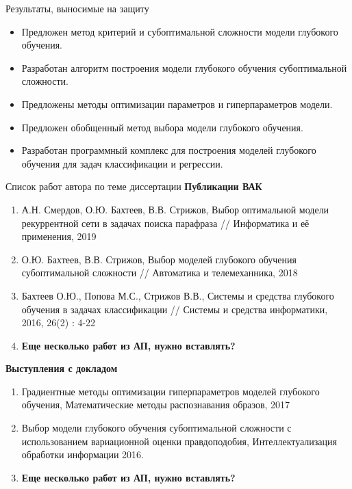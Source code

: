 \documentclass[11pt,pdf,utf8,russian,aspectratio=169]{beamer}
\begin{document}
\begin{frame}{Результаты, выносимые на защиту}
\begin{itemize}
\item Предложен метод критерий и субоптимальной сложности модели глубокого обучения.
\item Разработан алгоритм построения модели глубокого обучения субоптимальной сложности.
\item Предложены методы оптимизации параметров и гиперпараметров модели.
\item Предложен обобщенный метод выбора модели глубокого обучения.
\item Разработан программный комплекс для построения моделей глубокого обучения для задач классификации и регрессии.
\end{itemize}
\end{frame}



\begin{frame}{Список работ автора по теме диссертации}
\footnotesize
\textbf{Публикации ВАК}\\
\begin{enumerate}
\item А.Н. Смердов,  О.Ю. Бахтеев, В.В. Стрижов, Выбор оптимальной модели рекуррентной сети в задачах поиска парафраза // Информатика и её применения, 2019
\item О.Ю. Бахтеев, В.В. Стрижов, Выбор моделей глубокого обучения субоптимальной сложности // Автоматика и телемеханника, 2018
\item Бахтеев О.Ю., Попова М.С., Стрижов В.В., Системы и средства глубокого обучения в задачах классификации // Системы и средства информатики, 2016, 26(2) : 4-22
\item \textbf{Еще несколько работ из АП, нужно вставлять?}
\end{enumerate}
\textbf{Выступления с докладом}\\
\begin{enumerate}
\item Градиентные методы оптимизации гиперпараметров моделей глубокого обучения, Математические методы распознавания образов, 2017
\item Выбор модели глубокого обучения субоптимальной сложности с использованием вариационной оценки правдоподобия, Интеллектуализация обработки информации 2016.
\item \textbf{Еще несколько работ из АП, нужно вставлять?}
\end{enumerate}
\end{frame}
\end{document}
